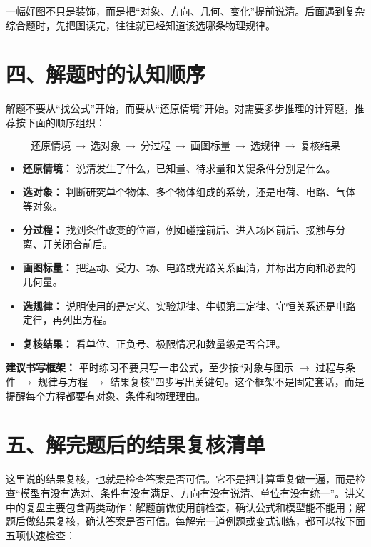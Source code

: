 一幅好图不只是装饰，而是把“对象、方向、几何、变化”提前说清。后面遇到复杂综合题时，先把图读完，往往就已经知道该选哪条物理规律。

\section*{四、解题时的认知顺序}

解题不要从“找公式”开始，而要从“还原情境”开始。对需要多步推理的计算题，推荐按下面的顺序组织：

\[
\boxed{\text{还原情境}}\ \rightarrow\
\boxed{\text{选对象}}\ \rightarrow\
\boxed{\text{分过程}}\ \rightarrow\
\boxed{\text{画图标量}}\ \rightarrow\
\boxed{\text{选规律}}\ \rightarrow\
\boxed{\text{复核结果}}
\]

\begin{itemize}
  \item \textbf{还原情境：} 说清发生了什么，已知量、待求量和关键条件分别是什么。
  \item \textbf{选对象：} 判断研究单个物体、多个物体组成的系统，还是电荷、电路、气体等对象。
  \item \textbf{分过程：} 找到条件改变的位置，例如碰撞前后、进入场区前后、接触与分离、开关闭合前后。
  \item \textbf{画图标量：} 把运动、受力、场、电路或光路关系画清，并标出方向和必要的几何量。
  \item \textbf{选规律：} 说明使用的是定义、实验规律、牛顿第二定律、守恒关系还是电路定律，再列出方程。
  \item \textbf{复核结果：} 看单位、正负号、极限情况和数量级是否合理。
\end{itemize}

\textbf{建议书写框架：} 平时练习不要只写一串公式，至少按“对象与图示 $\to$ 过程与条件 $\to$ 规律与方程 $\to$ 结果复核”四步写出关键句。这个框架不是固定套话，而是提醒每个方程都要有对象、条件和物理理由。

\section*{五、解完题后的结果复核清单}

这里说的结果复核，也就是检查答案是否可信。它不是把计算重复做一遍，而是检查“模型有没有选对、条件有没有满足、方向有没有说清、单位有没有统一”。讲义中的复盘主要包含两类动作：解题前做使用前检查，确认公式和模型能不能用；解题后做结果复核，确认答案是否可信。每解完一道例题或变式训练，都可以按下面五项快速检查：

